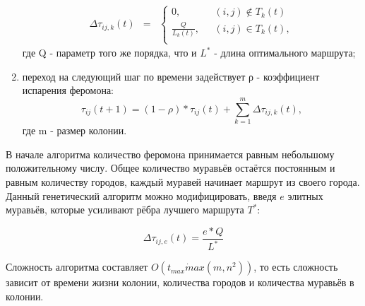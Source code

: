 \documentclass[../main.tex]{subfiles}
\begin{document}
\begin{enumerate}[1)]
		\begin{equation}\label{eq2.9}
			\begin{matrix}
			\Delta τ_{ij,k}(t) & = 
			& \left\{
				\begin{matrix}
				0, & \mbox{ } (i, j) \notin T_k(t) \\
				\frac {Q} {L_k(t)}, & \mbox{ } (i, j) \in T_k(t), \\
				\end{matrix} \right.
			\end{matrix}
		\end{equation}
		где Q - параметр того же порядка, что и $L^*$ - длина оптимального маршрута;
		
		\item переход на следующий шаг по времени задействует ρ - коэффициент испарения феромона:
		\begin{equation}
			\label{eq2.10}
			τ_{ij}(t+1) = (1-ρ) * τ_{ij}(t) + \sum \limits_{k=1}^m \Delta τ_{ij,k}(t),
		\end{equation}
		где m - размер колонии.
	
	\end{enumerate}
	\cite{RECA}
	
	В начале алгоритма количество феромона принимается равным небольшому положительному числу.
	Общее количество муравьёв остаётся постоянным и равным количеству городов, каждый муравей начинает маршрут из своего города. 
	Данный генетический алгоритм можно модифицировать, введя $e$ элитных муравьёв, которые усиливают рёбра лучшего маршрута $T^*$:
	
	\begin{equation}
		\label{eq2.11}
		\Delta τ_{ij,e}(t) = \frac {e * Q} {L^*}
	\end{equation} \cite{RECA}
	
	
	Сложность алгоритма составляет $O(t_{max} \dot max(m,n^2))$, то есть сложность зависит от времени жизни колонии, количества городов и количества муравьёв в колонии. \cite{RECA}
	
\end{document}
